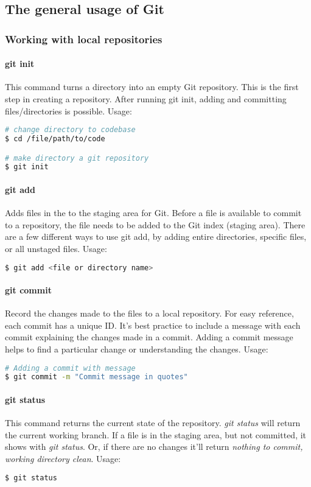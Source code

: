 \documentclass[a4paper]{report}
\begin{document}
\subsection{The general usage of Git}
\subsubsection{Working with local repositories}
\paragraph{git init}
This command turns a directory into an empty Git repository. This is the first step in creating a repository. After running git init, adding and committing files/directories is possible.
Usage:


\begin{lstlisting}[language=bash]
# change directory to codebase
$ cd /file/path/to/code

# make directory a git repository
$ git init
\end{lstlisting}

\paragraph{git add}
Adds files in the to the staging area for Git. Before a file is available to commit to a repository, the file needs to be added to the Git index (staging area). There are a few different ways to use git add, by adding entire directories, specific files, or all unstaged files.
Usage:
\begin{lstlisting}[language=bash]
$ git add <file or directory name>
\end{lstlisting}
\paragraph{git commit}
Record the changes made to the files to a local repository. For easy reference, each commit has a unique ID.
It’s best practice to include a message with each commit explaining the changes made in a commit. Adding a commit message helps to find a particular change or understanding the changes.
Usage:
\begin{lstlisting}[language=bash]
# Adding a commit with message
$ git commit -m "Commit message in quotes"
\end{lstlisting}

\paragraph{git status}
This command returns the current state of the repository.
\emph{git status} will return the current working branch. If a file is in the staging area, but not committed, it shows with \emph{git status}. Or, if there are no changes it'll return \emph{nothing to commit, working directory clean}.
Usage:
\begin{lstlisting}[language=bash]
$ git status
\end{lstlisting}
\end{document}
